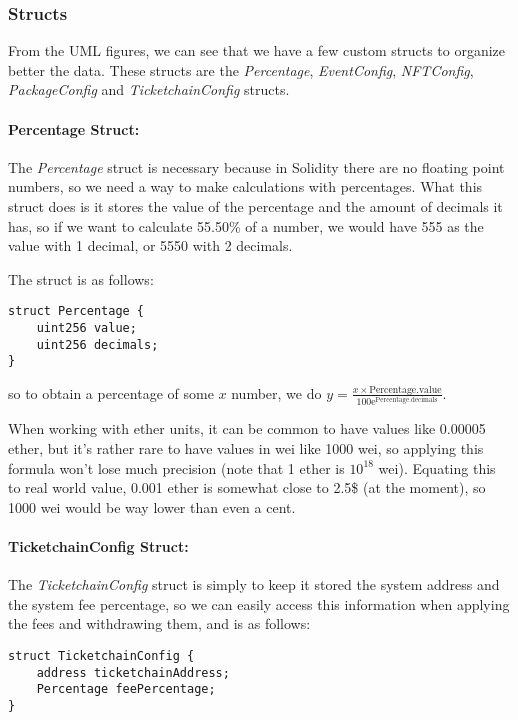 \subsubsection{Structs}\label{subsubsec:structs}

From the UML figures, we can see that we have a few custom structs to organize
better the data. These structs are the \textit{Percentage},
\textit{EventConfig}, \textit{NFTConfig}, \textit{PackageConfig} and
\textit{TicketchainConfig} structs.

\paragraph{Percentage Struct:} The \textit{Percentage} struct is necessary because in Solidity there are no
floating point numbers, so we need a way to make calculations with percentages.
What this struct does is it stores the value of the percentage and the amount
of decimals it has, so if we want to calculate 55.50\% of a number, we would
have 555 as the value with 1 decimal, or 5550 with 2 decimals.

The struct is as follows:
\begin{lstlisting}[caption=Percentage struct]
struct Percentage {
	uint256 value;
	uint256 decimals;
}
\end{lstlisting}
so to obtain a percentage of some $x$ number, we do $y = \frac{x \times
		\text{Percentage.value}}{100\mathrm{e}^\text{Percentage.decimals}}$.

When working with ether units, it can be common to have values like 0.00005
ether, but it's rather rare to have values in wei like 1000 wei, so applying
this formula won't lose much precision (note that 1 ether is $10^{18}$ wei).
Equating this to real world value, 0.001 ether is somewhat close to 2.5\$ (at
the moment), so 1000 wei would be way lower than even a cent.

\paragraph{TicketchainConfig Struct:} The \textit{TicketchainConfig} struct is simply to keep it stored the system
address and the system fee percentage, so we can easily access this information
when applying the fees and withdrawing them, and is as follows:
\begin{lstlisting}[caption=TicketchainConfig struct]
struct TicketchainConfig {
    address ticketchainAddress;
    Percentage feePercentage;
}
\end{lstlisting}

